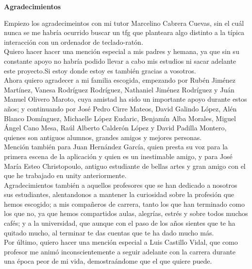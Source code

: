\thispagestyle{empty}

\begin{flushleft}
	\textbf{\LARGE Agradecimientos}\\
\end{flushleft}

\vspace{1cm}

\begin{flushleft}
\quad Empiezo los agradecimeintos con mi tutor Marcelino Cabrera Cuevas, sin el cuál nunca se me habría ocurrido buscar un tfg que planteara algo distinto a la típica interacción con un ordenador de teclado-ratón.\\
	
\quad Quiero hacer hacer una mención especial a mis padres y hemana, ya que sin su constante apoyo no habría podido llevar a cabo mis estudios ni sacar adelante este proyecto.Si estoy donde estoy es también gracias a vosotros.\\
	
\quad Ahora quiero agradecer a mi familia escogida, empezando por Rubén Jiménez Martínez, Vanesa Rodríguez Rodríguez, Nathaniel Jiménez Rodríguez y Juán Manuel Olivero Maroto, cuya amistad ha sido un importante apoyo durante estos años; y continuando por José Pedro Cirre Mateos, David Galindo López, Alén Blanco Domínguez, Michaelle López Eudaric, Benjamín Alba Morales, Miguel Ángel Cano Mesa, Raúl Alberto Calderón López y David Padilla Montero, quienes son antiguos alumnos, grandes amigos y mejores personas.\\
	
\quad Mención también para Juan Hernández García, quien presta su voz para la primera escena de la aplicación y quien es un inestimable amigo, y para José María Esteo Christopoulo, antiguo estudiante de bellas artes y gran amigo con el que he trabajado en unity anteriormente.\\

\quad Agradecimientos también a aquellos profesores que se han dedicado a nosotros sus estudiantes, alentandonos a mantener la curiosidad sobre la profesión que hemos escogido; a mis compañeros de carrera, tanto los que han terminado como los que no, ya que hemos compartidos aulas, alegrías, estrés y sobre todos muchos cafés; y a la universidad, que aunque con el paso de los años sientes que te ha quitado mucho, al terminar te das cuentas que te ha dado mucho más.\\

\quad Por último, quiero hacer una mención especial a Luis Castillo Vidal, que como profesor me animó inconscientemente a seguir adelante con la carrera durante una época peor de mi vida, demostraándome que el que quiere puede.\\
	
\end{flushleft}

\newpage %
